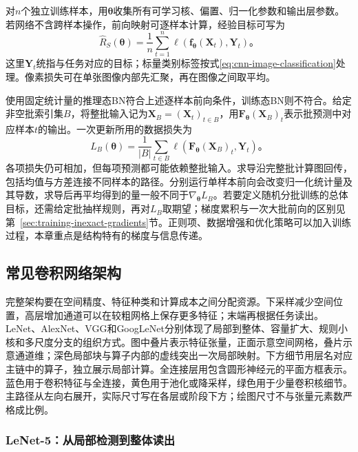 对$n$个独立训练样本，用$\bm\theta$收集所有可学习核、偏置、归一化参数和输出层参数。若网络不含跨样本操作，前向映射可逐样本计算，经验目标可写为
\begin{equation}
  \widehat R_S(\bm\theta)=\frac1n\sum_{t=1}^{n}
    \ell\!\left(\bm f_{\bm\theta}(\bm X_t),\bm Y_t\right)\text{。}
  \label{eq:cnn-training-objective}
\end{equation}
这里$\bm Y_t$统指与任务对应的目标；标量类别标签按式\eqref{eq:cnn-image-classification}处理。像素损失可在单张图像内部先汇聚，再在图像之间取平均。

使用固定统计量的推理态BN符合上述逐样本前向条件，训练态BN则不符合。给定非空批索引集$B$，将整批输入记为$\bm X_B=(\bm X_t)_{t\in B}$，用$\bm F_{\bm\theta}(\bm X_B)_t$表示批预测中对应样本$t$的输出。一次更新所用的数据损失为
\begin{equation}
  L_B(\bm\theta)=\frac1{|B|}\sum_{t\in B}
    \ell\!\left(\bm F_{\bm\theta}(\bm X_B)_t,\bm Y_t\right)\text{。}
  \label{eq:cnn-batch-objective}
\end{equation}
各项损失仍可相加，但每项预测都可能依赖整批输入。求导沿完整批计算图回传，包括均值与方差连接不同样本的路径。分别运行单样本前向会改变归一化统计量及其导数，求导后再平均得到的量一般不同于$\nabla_{\bm\theta}L_B$。若要定义随机分批训练的总体目标，还需给定批抽样规则，再对$L_B$取期望；梯度累积与一次大批前向的区别见第~\ref{sec:training-inexact-gradients}节。正则项、数据增强和优化策略可以加入训练过程，本章重点是结构特有的梯度与信息传递。

\FloatBarrier

\subsection{常见卷积网络架构}
\label{sec:cnn-classic-architectures}

完整架构要在空间精度、特征种类和计算成本之间分配资源。下采样减少空间位置，高层增加通道可以在较粗网格上保存更多特征；末端再根据任务读出。LeNet、AlexNet、VGG和GoogLeNet分别体现了局部到整体、容量扩大、规则小核和多尺度分支的组织方式。图中叠片表示特征张量，正面示意空间网格，叠片示意通道维；深色局部块与算子内部的虚线突出一次局部映射。下方细节用层名对应主链中的算子，独立展示局部计算。全连接层用包含圆形神经元的平面方框表示。蓝色用于卷积特征与全连接，黄色用于池化或降采样，绿色用于少量卷积核细节。主路径从左向右展开，实际尺寸写在各层或阶段下方；绘图尺寸不与张量元素数严格成比例。

\subsubsection{LeNet-5：从局部检测到整体读出}
\label{sec:cnn-lenet}

